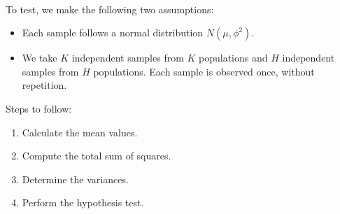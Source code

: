 \documentclass{article}
\begin{document}
\begin{itemize}
		\\
		To test, we make the following two assumptions:
		\begin{itemize}
			\item Each sample follows a normal distribution \( N(\mu, \phi^2) \).
			\item We take \( K \) independent samples from \( K \) populations and \( H \) independent samples from \( H \) populations. Each sample is observed once, without repetition.
		\end{itemize}
		Steps to follow:
		\begin{enumerate}
			\item Calculate the mean values.
			\item Compute the total sum of squares.
			\item Determine the variances.
			\item Perform the hypothesis test.
		\end{enumerate}
	\end{itemize}
\end{document}

